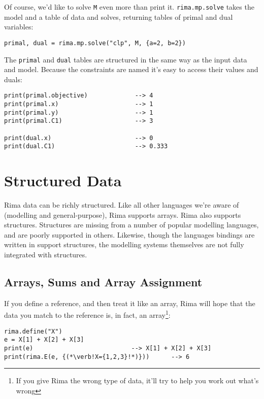 \documentclass[a4paper,12pt]{article}
\begin{document}
Of course, we'd like to solve \lstinline!M! even more than print it.
\lstinline{rima.mp.solve} takes the model and a table of data and solves,
returning tables of primal and dual variables:
  \begin{lstlisting}
primal, dual = rima.mp.solve("clp", M, {a=2, b=2})
  \end{lstlisting}

The \lstinline!primal! and \lstinline!dual! tables are structured in the same
way as the input data and model.
Because the constraints are named it's easy to access their values and duals:
  \begin{lstlisting}
print(primal.objective)             --> 4
print(primal.x)                     --> 1
print(primal.y)                     --> 1
print(primal.C1)                    --> 3

print(dual.x)                       --> 0
print(dual.C1)                      --> 0.333
  \end{lstlisting}



\section{Structured Data}
Rima data can be richly structured.
Like all other languages we're aware of (modelling and general-purpose), Rima supports arrays.
Rima also supports structures.
Structures are missing from a number of popular modelling languages,
and are poorly supported in others.
Likewise, though the languages bindings are written in support structures,
the modelling systems themselves are not fully integrated with structures.


\subsection{Arrays, Sums and Array Assignment}

If you define a reference, and then treat it like an array,
Rima will hope that the data you match to the reference is,
in fact, an array\footnote{If you give Rima the wrong type of data, it'll try to help you work out what's wrong}:
  \begin{lstlisting}
rima.define("X")
e = X[1] + X[2] + X[3]
print(e)                           --> X[1] + X[2] + X[3]
print(rima.E(e, {(*\verb!X={1,2,3}!*)}))      --> 6
  \end{lstlisting}
\end{document}
